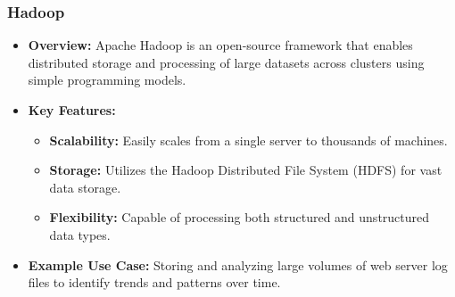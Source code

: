 \documentclass{beamer}
\begin{document}
\begin{frame}[fragile]
    \frametitle{Hadoop}
    \begin{itemize}
        \item \textbf{Overview:} 
            Apache Hadoop is an open-source framework that enables distributed storage and processing of large datasets across clusters using simple programming models.
        
        \item \textbf{Key Features:}
            \begin{itemize}
                \item \textbf{Scalability:} Easily scales from a single server to thousands of machines.
                \item \textbf{Storage:} Utilizes the Hadoop Distributed File System (HDFS) for vast data storage.
                \item \textbf{Flexibility:} Capable of processing both structured and unstructured data types.
            \end{itemize}
        
        \item \textbf{Example Use Case:} 
            Storing and analyzing large volumes of web server log files to identify trends and patterns over time.
    \end{itemize}
\end{frame}
\end{document}
